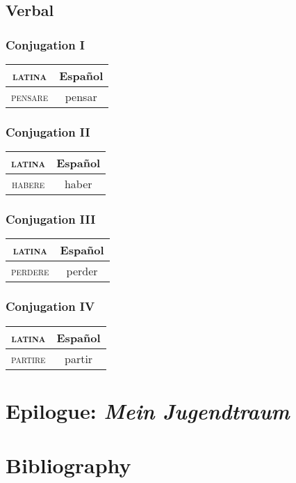 \documentclass{report}
\begin{document}
\section{Verbal}

\subsection{Conjugation I}

\begin{tabular}{|c|c|}
  \hline
  \textsc{latina} & Español \\
  \hline
  \textsc{pensare} & pensar \\
  \hline
\end{tabular}

\subsection{Conjugation II}

\begin{tabular}{|c|c|}
  \hline
  \textsc{latina} & Español \\
  \hline
  \textsc{habere} & haber \\
  \hline
\end{tabular}

\subsection{Conjugation III}

\begin{tabular}{|c|c|}
  \hline
  \textsc{latina} & Español \\
  \hline
  \textsc{perdere} & perder \\
  \hline
\end{tabular}

\subsection{Conjugation IV}

\begin{tabular}{|c|c|}
  \hline
  \textsc{latina} & Español \\
  \hline
  \textsc{partire} & partir \\
  \hline
\end{tabular}

\chapter*{Epilogue: \emph{Mein Jugendtraum}}

\nocite{*}

\chapter*{Bibliography}

\printbibliography[heading=subbibintoc, keyword=romance, title={Romance Linguistics}]
\end{document}
